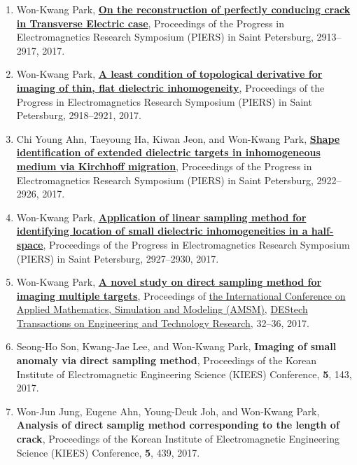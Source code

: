 \documentclass[10pt,A4]{article}
\begin{document}
\begin{enumerate}
\item\label{C-PIERS2017C} Won-Kwang Park, \href{https://doi.org/10.1109/PIERS.2017.8262252}{\textbf{On the reconstruction of perfectly conducing crack in Transverse Electric case}}, Proceedings of the Progress in Electromagnetics Research Symposium (PIERS) in Saint Petersburg, 2913--2917, 2017.
\item\label{C-PIERS2017D} Won-Kwang Park, \href{https://doi.org/10.1109/PIERS.2017.8262253}{\textbf{A least condition of topological derivative for imaging of thin, flat dielectric inhomogeneity}}, Proceedings of the Progress in Electromagnetics Research Symposium (PIERS) in Saint Petersburg, 2918--2921, 2017.
\item\label{C-PIERS2017A} Chi Young Ahn, Taeyoung Ha, Kiwan Jeon, and Won-Kwang Park, \href{https://doi.org/10.1109/PIERS.2017.8262254}{\textbf{Shape identification of extended dielectric targets in inhomogeneous medium via Kirchhoff migration}}, Proceedings of the Progress in Electromagnetics Research Symposium (PIERS) in Saint Petersburg, 2922--2926, 2017.
\item\label{C-PIERS2017E} Won-Kwang Park, \href{https://doi.org/10.1109/PIERS.2017.8262255}{\textbf{Application of linear sampling method for identifying location of small dielectric inhomogeneities in a half-space}}, Proceedings of the Progress in Electromagnetics Research Symposium (PIERS) in Saint Petersburg, 2927--2930, 2017.
\item\label{C-AMSM2017} Won-Kwang Park, \href{http://dx.doi.org/10.12783/dtetr/amsm2017/14814}{\textbf{A novel study on direct sampling method for imaging multiple targets}}, Proceedings of \href{http://www.amsm2017.org}{the  International Conference on Applied Mathematics, Simulation and Modeling (AMSM)}, \href{http://www.destechpub.com/product/destech-transactions-engineering-technology-research/}{DEStech Transactions on Engineering and Technology Research}, 32--36, 2017.
\item\label{C-KIEES2017A} Seong-Ho Son, Kwang-Jae Lee, and Won-Kwang Park, \textbf{Imaging of small anomaly via direct sampling method}, Proceedings of the Korean Institute of Electromagnetic Engineering Science (KIEES) Conference, \textbf{5}, 143, 2017.
\item\label{C-KIEES2017B} Won-Jun Jung, Eugene Ahn, Young-Deuk Joh, and Won-Kwang Park, \textbf{Analysis of direct samplig method corresponding to the length of crack}, Proceedings of the Korean Institute of Electromagnetic Engineering Science (KIEES) Conference, \textbf{5}, 439, 2017.

\end{enumerate}
\end{document}
